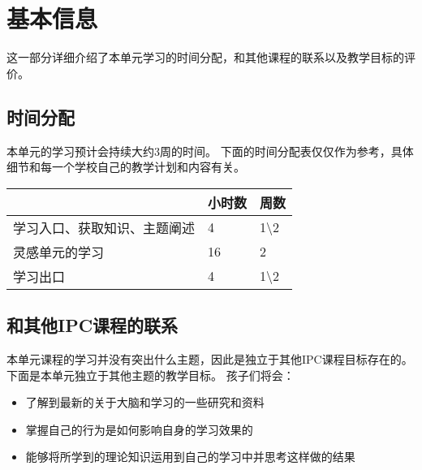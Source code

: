 \chapter{基本信息}
    这一部分详细介绍了本单元学习的时间分配，和其他课程的联系以及教学目标的评价。

\section{时间分配}
    本单元的学习预计会持续大约3周的时间。
    下面的时间分配表仅仅作为参考，具体细节和每一个学校自己的教学计划和内容有关。


\begin{table}[h]     
\begin{tabular}{l|l|l}
\hline
\colorbox[gray]{0.95}{ & 小时数 & 周数 } \\
\hline
学习入口、获取知识、主题阐述 &  4 & 1\textbackslash2 \\
灵感单元的学习  & 16  &   2  \\
学习出口  & 4  &  1\textbackslash2 \\
\hline
\end{tabular}
\end{table}



\section{和其他IPC课程的联系}
    本单元课程的学习并没有突出什么主题，因此是独立于其他IPC课程目标存在的。下面是本单元独立于其他主题的教学目标。
    孩子们将会：
    \begin{itemize}
      \item 了解到最新的关于大脑和学习的一些研究和资料 
      \item 掌握自己的行为是如何影响自身的学习效果的
      \item 能够将所学到的理论知识运用到自己的学习中并思考这样做的结果
    \end{itemize}

